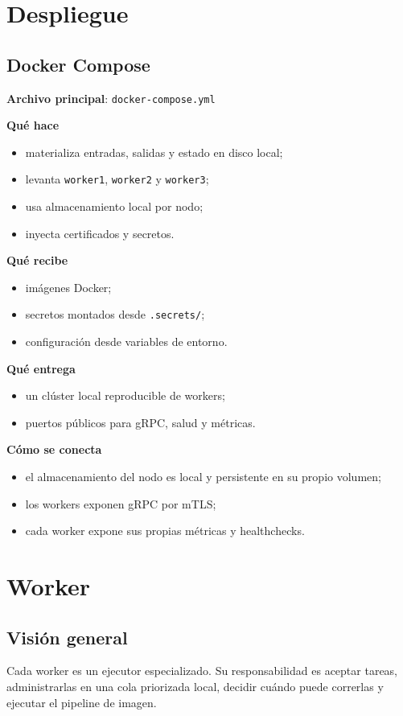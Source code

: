 \documentclass[11pt]{article}
\begin{document}
\section{Despliegue}

\subsection{Docker Compose}
\textbf{Archivo principal}: \texttt{docker-compose.yml}

\textbf{Qué hace}
\begin{itemize}
\item materializa entradas, salidas y estado en disco local;
\item levanta \texttt{worker1}, \texttt{worker2} y \texttt{worker3};
\item usa almacenamiento local por nodo;
\item inyecta certificados y secretos.
\end{itemize}

\textbf{Qué recibe}
\begin{itemize}
\item imágenes Docker;
\item secretos montados desde \texttt{.secrets/};
\item configuración desde variables de entorno.
\end{itemize}

\textbf{Qué entrega}
\begin{itemize}
\item un clúster local reproducible de workers;
\item puertos públicos para gRPC, salud y métricas.
\end{itemize}

\textbf{Cómo se conecta}
\begin{itemize}
\item el almacenamiento del nodo es local y persistente en su propio volumen;
\item los workers exponen gRPC por mTLS;
\item cada worker expone sus propias métricas y healthchecks.
\end{itemize}

\section{Worker}

\subsection{Visión general}
Cada worker es un ejecutor especializado. Su responsabilidad es aceptar tareas, administrarlas en una cola priorizada local, decidir cuándo puede correrlas y ejecutar el pipeline de imagen.
\end{document}
